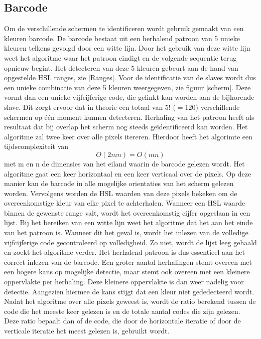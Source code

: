  \subsection{Barcode} \label{barcode}
Om de verschillende schermen te identificeren wordt gebruik gemaakt van een kleuren barcode. De barcode bestaat uit een herhalend patroon van 5 unieke kleuren telkens gevolgd door een witte lijn. Door het gebruik van deze witte lijn weet het algoritme waar het patroon eindigt en de volgende sequentie terug opnieuw begint. Het detecteren van deze 5 kleuren gebeurt aan de hand van opgestelde HSL ranges, zie \ref{Ranges}. Voor de identificatie van de slaves wordt dus een unieke combinatie van deze 5 kleuren weergegeven, zie figuur \ref{scherm}. Deze vormt dan een unieke vijfcijferige code, die gelinkt kan worden aan de bijhorende slave. Dit zorgt ervoor dat in theorie een totaal van $5!$ ($=120$) verschillende schermen op één moment kunnen detecteren. Herhaling van het patroon heeft als resultaat dat bij overlap het scherm nog steeds geïdentificeerd kan worden. Het algoritme zal twee keer over alle pixels itereren. Hierdoor heeft het algorimte een tijdscomplexiteit van
\[O(2mn)=O(mn)\]
met m en n de dimensies van het eiland waarin de barcode gelezen wordt. Het algoritme gaat een keer horizontaal en een keer verticaal over de pixels. Op deze manier kan de barcode in alle mogelijke orientaties van het scherm gelezen worden. Vervolgens worden de HSL waarden van deze pixels bekeken om de overeenkomstige kleur van elke pixel te achterhalen. Wanneer een HSL waarde binnen de gewenste range valt, wordt het overeenkomstig cijfer opgeslaan in een lijst. Bij het bereiken van een witte lijn weet het algoritme dat het aan het einde van het patroon is. Wanneer dit het geval is, wordt het inlezen van de volledige vijfcijferige code gecontroleerd op volledigheid. Zo niet, wordt de lijst leeg gehaald en zoekt het algoritme verder. Het herhalend patroon is dus essentieel aan het correct inlezen van de barcode. Een groter aantal herhalingen stemt overeen met een hogere kans op mogelijke detectie, maar stemt ook overeen met een kleinere oppervlakte per herhaling. Deze kleinere oppervlakte is dan weer nadelig voor detectie. Aangezien hiermee de kans stijgt dat een kleur niet gededecteerd wordt. Nadat het algoritme over alle pixels geweest is, wordt de ratio berekend tussen de code die het meeste keer gelezen is en de totale aantal codes die zijn gelezen. Deze ratio bepaalt dan of de code, die door de horizontale iteratie of door de verticale iteratie het meest gelezen is, gebruikt wordt.

